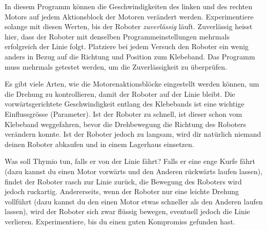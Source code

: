 In diesem Programm können die Geschwindigkeiten des linken und des rechten Motors auf jedem Aktionsblock der Motoren verändert werden.
Experimentiere solange mit diesen Werten,
bis der Roboter \emph{zuverlässig} läuft.
Zuverlässig heisst hier, dass der Roboter mit denselben Programmeinstellungen mehrmals erfolgreich der Linie folgt.
Platziere bei jedem Versuch den Roboter ein wenig anders in Bezug auf die Richtung und Position zum Klebeband.
Das Programm muss mehrmals getestet werden, um die Zuverlässigkeit zu überprüfen.

Es gibt viele Arten, wie die Motorenaktionsblöcke eingestellt werden können, um die Drehung zu kontrollieren, damit der Roboter auf der Linie bleibt. Die vorwärtsgerichtete Geschwindigkeit entlang des Klebebands ist eine wichtige Einflussgrösse (Parameter). 
Ist der Roboter zu schnell,
ist dieser schon vom Klebeband weggefahren,
bevor die Drehbewegung die Richtung des Roboters verändern konnte.
Ist der Roboter jedoch zu langsam, wird dir natürlich niemand deinen Roboter abkaufen
und in einem Lagerhaus einsetzen.

Was soll Thymio tun, falls er von der Linie fährt?
Falls er eine enge Kurfe fährt (dazu kannst du einen Motor vorwärts und den Anderen rückwärts laufen lassen), findet der Roboter rasch zur Linie zurück, die Bewegung des Roboters wird jedoch ruckartig. Andererseits, wenn der Roboter nur eine leichte Drehung vollführt (dazu kannst du den einen Motor etwas schneller als den Anderen laufen lassen), wird der Roboter sich zwar flüssig bewegen, eventuell jedoch die Linie verlieren. Experimentiere, bis du einen guten Kompromiss gefunden hast.



\vfill


